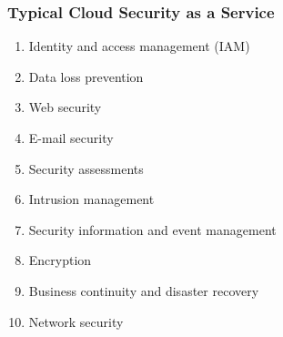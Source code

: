 \newpage

\subsubsection{Typical Cloud Security as a Service}
\begin{enumerate}
    \item Identity and access management (IAM)
    \item Data loss prevention
    \item Web security
    \item E-mail security
    \item Security assessments
    \item Intrusion management
    \item Security information and event management
    \item Encryption
    \item Business continuity and disaster recovery
    \item Network security
\end{enumerate}